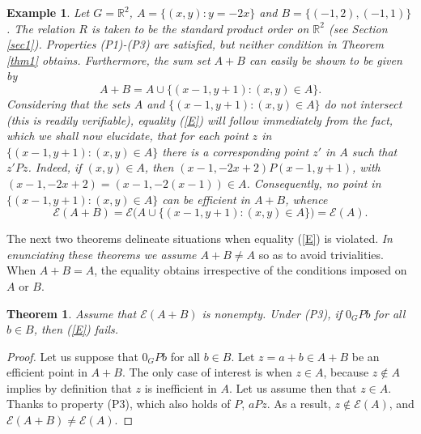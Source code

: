 \documentclass[pdflatex,sn-apa,11pt]{sn-jnl}%
\newtheorem{theorem}{Theorem}%
\newtheorem{example}{Example}%
\begin{document}
\begin{example}
\label{ex2}
Let $G = \mathbb{R}^{2}$, $A = \{(x, y): y = -2x\}$ and $B = \{(-1, 2), (-1, 1)\}$. The relation $R$ is taken to be the standard product order on $\mathbb{R}^{2}$ (see Section \ref{sec1}). Properties (P1)-(P3) are satisfied, but neither condition in Theorem \ref{thm1} obtains. Furthermore, the sum set $A+B$ can easily be shown to be given by \begin{equation*}A + B = A \cup \{(x-1, y+1): (x, y) \in A\}.\end{equation*}
Considering that the sets $A$ and $\{(x-1, y+1): (x, y) \in A\}$ do not intersect (this is readily verifiable), equality (\ref{E}) will follow immediately from the fact, which we shall now elucidate, that for each point $z$ in $\{(x-1, y+1): (x, y) \in A\}$ there is a corresponding point $z'$ in $A$ such that $z'Pz$. Indeed, if $(x, y) \in A$, then $(x-1, -2x+2)P(x-1, y+1)$, with $(x-1, -2x+2) = (x-1, -2(x-1)) \in A$. Consequently, no point in $\{(x-1, y+1): (x, y) \in A\}$ can be efficient in $A + B$, whence 
\begin{equation*}\mathscr{E}(A+B) = \mathscr{E}\biggl(A \cup \{(x-1, y+1): (x, y) \in A\}\biggr) = \mathscr{E}(A).\end{equation*}
\end{example}

The next two theorems delineate situations when equality (\ref{E}) is violated. \textit{In enunciating these theorems we assume $A+B \neq A$} so as to avoid trivialities. When $A+B = A$, the equality obtains irrespective of the conditions imposed on $A$ or $B$.

\begin{theorem}
\label{thm2}
Assume that $\mathscr{E}(A + B)$ is nonempty. Under (P3), if $0_{G}Pb$ for all $b \in B$, then (\ref{E}) fails.
\end{theorem}

\begin{proof}
Let us suppose that $0_{G}Pb$ for all $b \in B$. Let $z = a + b \in A+B$ be an efficient point in $A+B$. The only case of interest is when $z \in A$, because $z \notin A$ implies by definition that $z$ is inefficient in $A$. Let us assume then that $z \in A$. Thanks to property (P3), which also holds of $P$, $aPz$. As a result, $z \notin \mathscr{E}(A)$, and $\mathscr{E}(A + B) \neq \mathscr{E}(A)$.
\end{proof}

\end{document}
